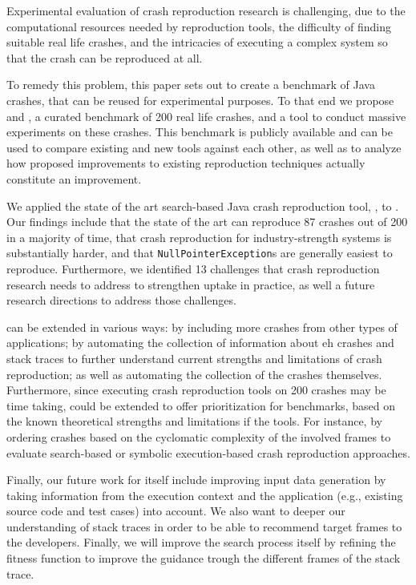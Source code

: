 Experimental evaluation of crash reproduction research is challenging, due to the computational resources needed by reproduction tools, the difficulty of finding suitable real life crashes, and the intricacies of executing a complex system so that the crash can be reproduced at all.

To remedy this problem, this paper sets out to create a benchmark of Java crashes, that can be reused for experimental purposes.
To that end we propose \crashpack and \exrunner, a curated benchmark of 200 real life crashes, and a tool to conduct massive experiments on these crashes.
This benchmark is publicly available and can be used to compare existing and new tools against each other, as well as to analyze how proposed improvements to existing reproduction techniques actually constitute an improvement.

We applied the state of the art search-based Java crash reproduction tool, \evocrash, to \crashpack. Our findings include that the state of the art can reproduce 87 crashes out of 200 in a majority of time, that crash reproduction for industry-strength systems is substantially harder, and that \texttt{NullPointerException}s are generally easiest to reproduce. Furthermore, we identified 13 challenges that crash reproduction research needs to address to strengthen uptake in practice, as well a future research directions to address those challenges.

\crashpack  can be extended in various ways: by including more crashes from other types of applications; by automating the collection of information about eh crashes and stack traces to further understand current strengths and limitations of crash reproduction; as well as automating the collection of the crashes themselves. Furthermore, since executing crash reproduction tools on 200 crashes may be time taking, \crashpack could be extended to offer prioritization for benchmarks, based on the known theoretical strengths and limitations if the tools. For instance, by ordering crashes based on the cyclomatic complexity of the involved frames to evaluate search-based or symbolic execution-based crash reproduction approaches. 

Finally, our future work for \evocrash itself include improving input data generation by taking information from the execution context and the application (e.g., existing source code and test cases) into account. We also want to deeper our understanding of stack traces in order to be able to recommend target frames to the developers. Finally, we will improve the search process itself by refining the fitness function to improve the guidance trough the different frames of the stack trace.

